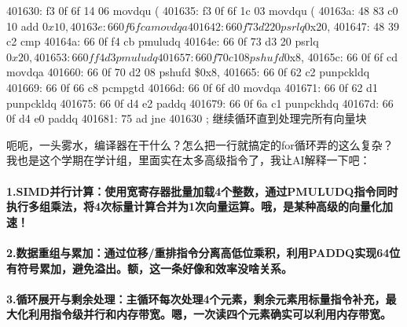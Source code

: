\documentclass[11pt]{article}
\begin{document}
\begin{commandline}
401630: f3 0f 6f 14 06        movdqu (%
401635: f3 0f 6f 1c 03        movdqu (%
40163a: 48 83 c0 10           add    $0x10,%
40163e: 66 0f 6f ca           movdqa %
401642: 66 0f 73 d2 20        psrlq  $0x20,%
401647: 48 39 c2              cmp    %
40164a: 66 0f f4 cb           pmuludq %
40164e: 66 0f 73 d3 20        psrlq  $0x20,%
401653: 66 0f f4 d3           pmuludq %
401657: 66 0f 70 c1 08        pshufd $0x8,%
40165c: 66 0f 6f cd           movdqa %
401660: 66 0f 70 d2 08        pshufd \$0x8,%
401665: 66 0f 62 c2           punpckldq %
401669: 66 0f 66 c8           pcmpgtd %
40166d: 66 0f 6f d0           movdqa %
401671: 66 0f 62 d1           punpckldq %
401675: 66 0f d4 e2           paddq  %
401679: 66 0f 6a c1           punpckhdq %
40167d: 66 0f d4 e0           paddq  %
401681: 75 ad                 jne    401630              ; 继续循环直到处理完所有向量块
\end{commandline}
呃呃，一头雾水，编译器在干什么？怎么把一行就搞定的for循环弄的这么复杂？我也是这个学期在学计组，里面实在太多高级指令了，我让AI解释一下吧：​
\paragraph{1.SIMD并行计算：使用宽寄存器批量加载4个整数，通过PMULUDQ指令同时执行多组乘法，将4次标量计算合并为1次向量运算。哦，是某种高级的向量化加速！}
\paragraph{​2.数据重组与累加：通过位移/重排指令分离高低位乘积，利用PADDQ实现64位有符号累加，避免溢出。额，这一条好像和效率没啥关系。}
\paragraph{​3.循环展开与剩余处理：主循环每次处理4个元素，剩余元素用标量指令补充，最大化利用指令级并行和内存带宽。嗯，一次读四个元素确实可以利用内存带宽。}
\end{document}
